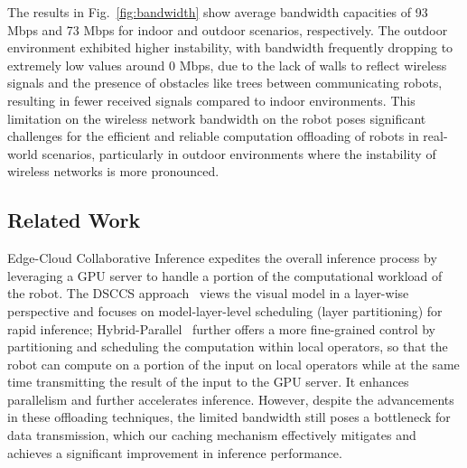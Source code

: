 The results in Fig.~\ref{fig:bandwidth} show average bandwidth capacities of 93 Mbps and 73 Mbps for indoor and outdoor scenarios, respectively. 
The outdoor environment exhibited higher instability, with bandwidth frequently dropping to extremely low values around 0 Mbps, due to the lack of walls to reflect wireless signals and the presence of obstacles like trees between communicating robots, resulting in fewer received signals compared to indoor environments. This limitation on the wireless network bandwidth on the robot poses significant challenges for the efficient and reliable computation offloading of robots in real-world scenarios, particularly in outdoor environments where the instability of wireless networks is more pronounced.

\subsection{Related Work}
Edge-Cloud Collaborative Inference expedites the overall inference process by leveraging a GPU server to handle a portion of the computational workload of the robot. 
The DSCCS approach~\cite{liang2023dnn} views the visual model in a layer-wise perspective and focuses on model-layer-level scheduling (layer partitioning) for rapid inference;
Hybrid-Parallel~\cite{sun2024hybridparallel} further offers a more fine-grained control by partitioning and scheduling the computation within local operators, so that the robot can compute on a portion of the input on local operators while at the same time transmitting the result of the input to the GPU server.
It enhances parallelism and further accelerates inference. 
However, despite the advancements in these offloading techniques, the limited bandwidth still poses a bottleneck for data transmission, which our caching mechanism effectively mitigates and achieves a significant improvement in inference performance.


